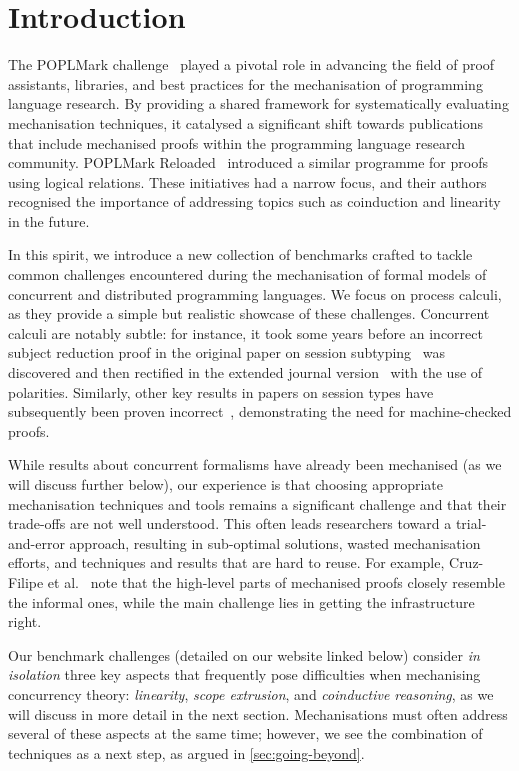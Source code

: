 \documentclass[runningheads]{llncs}
\begin{document}
\section{Introduction}
The POPLMark challenge~\cite{POPLMark}
played a pivotal role in advancing the field of proof assistants,
libraries, and best practices for the mechanisation of programming language research. By providing a shared framework for systematically
evaluating mechanisation techniques, it catalysed a significant
shift towards publications that include mechanised proofs within the programming language research community.
POPLMark Reloaded~\cite{POPLMarkReloaded} introduced a similar programme for proofs using logical relations.
These initiatives had a narrow focus, and their authors recognised the importance of addressing topics such as coinduction and linearity in the future.

In this spirit, we introduce a new collection of benchmarks
crafted to tackle common challenges encountered during
the mechanisation of formal models of concurrent and distributed
programming languages.  We focus on process calculi, as
they provide a simple but realistic showcase of these challenges.  Concurrent calculi are
notably subtle: for instance, it took some years before an incorrect
subject reduction proof in the original paper on session
subtyping~\cite{GH99} was discovered and then rectified in the extended journal version~\cite{GH05} with the use of
polarities.
Similarly, other key results in papers on session types have subsequently
been proven incorrect~\cite{Gay2020,10.1145/3290343}, demonstrating the
need for machine-checked proofs.

While results about concurrent
formalisms have already been mechanised (as we will discuss further
below), our experience is that choosing appropriate mechanisation
techniques and tools remains a significant challenge and that their
trade-offs are not well understood.  This often leads researchers
toward a trial-and-error approach, resulting in sub-optimal solutions,
wasted mechanisation efforts, and techniques and results that are hard
to reuse. For example, Cruz-Filipe et al.~\cite{Cruz-Filipe2021b} note that the high-level parts of
mechanised proofs closely resemble the informal ones, while the
main challenge lies in getting the infrastructure right.

Our benchmark challenges (detailed on our website linked below)
consider \emph{in isolation} three key aspects that frequently pose
difficulties when mechanising concurrency theory: \emph{linearity},
\emph{scope extrusion}, and \emph{coinductive reasoning}, as we will
discuss in more detail in the next section.  Mechanisations must often
address several of these aspects at the same time; however, we see the
combination of techniques as a next step, as argued in
\cref{sec:going-beyond}.
\end{document}
